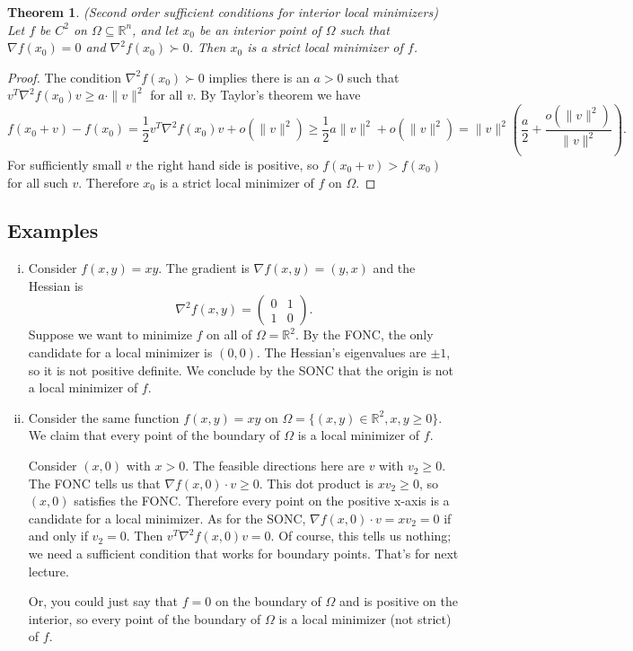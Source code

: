 \documentclass[11pt]{article}
\newcommand{\R}{\mathbb{R}}
\newtheorem{theorem}{Theorem}[subsection]
\begin{document}
\begin{theorem}
(Second order sufficient conditions for interior local minimizers) Let $f$ be $C^2$ on $\Omega \subseteq \R^n$, and let $x_0$ be an interior point of $\Omega$ such that $\nabla f(x_0) = 0$ and $\nabla^2 f(x_0) \succ 0$. Then $x_0$ is a strict local minimizer of $f$.
\end{theorem}
\begin{proof}
The condition $\nabla^2 f(x_0) \succ 0$ implies there is an $a > 0$ such that $v^T \nabla^2 f(x_0) v \geq a \cdot \|v\|^2$ for all $v$. By Taylor's theorem we have
\[
f(x_0 + v) - f(x_0) = \frac{1}{2} v^T \nabla^2 f(x_0) v + o(\|v\|^2) \geq \frac{1}{2} a\|v\|^2 + o(\|v\|^2) = \|v\|^2 \left( \frac{a}{2} + \frac{o(\|v\|^2)}{\|v\|^2} \right).
\]
For sufficiently small $v$ the right hand side is positive, so $f(x_0 + v) > f(x_0)$ for all such $v$. Therefore $x_0$ is a strict local minimizer of $f$ on $\Omega$.
\end{proof}

\subsection{Examples}
\begin{enumerate}[(i)]
\item 
Consider $f(x,y) = xy$. The gradient is $\nabla f(x,y) = (y,x)$ and the Hessian is 
\[
\nabla^2 f(x,y) = \begin{pmatrix}
0 & 1 \\ 1 & 0
\end{pmatrix}.
\]
Suppose we want to minimize $f$ on all of $\Omega = \R^2$. By the FONC, the only candidate for a local minimizer is $(0,0)$. The Hessian's eigenvalues are $\pm 1$, so it is not positive definite. We conclude by the SONC that the origin is not a local minimizer of $f$.

\item 
Consider the same function $f(x,y) = xy$ on $\Omega = \{(x,y) \in \R^2, x, y \geq 0\}$. We claim that every point of the boundary of $\Omega$ is a local minimizer of $f$.

Consider $(x,0)$ with $x > 0$. The feasible directions here are $v$ with $v_2 \geq 0$. The FONC tells us that $\nabla f(x,0) \cdot v\geq 0$. This dot product is $xv_2 \geq 0$, so $(x,0)$ satisfies the FONC. Therefore every point on the positive x-axis is a candidate for a local minimizer. As for the SONC, $\nabla f(x,0) \cdot v = xv_2 = 0$ if and only if $v_2 = 0$. Then $v^T \nabla^2 f(x,0) v = 0$. Of course, this tells us nothing; we need a sufficient condition that works for boundary points. That's for next lecture.

Or, you could just say that $f = 0$ on the boundary of $\Omega$ and is positive on the interior, so every point of the boundary of $\Omega$ is a local minimizer (not strict) of $f$.

\end{enumerate}
\end{document}
